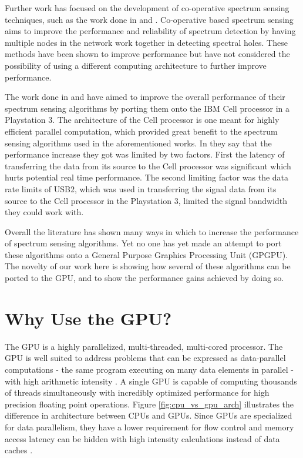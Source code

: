 Further work has focused on the development of co-operative spectrum sensing techniques, such as the work done in \cite{GanLi05} and \cite{SadAzm08}.  Co-operative based spectrum sensing aims to improve the performance and reliability of spectrum detection by having multiple nodes in the network work together in detecting spectral holes.  These methods have been shown to improve performance but have not considered the possibility of using a different computing architecture to further improve performance.

The work done in \cite{OshClaEbe07} and \cite{FenBos07} have aimed to improve the overall performance of their spectrum sensing algorithms by porting them onto the IBM Cell processor in a Playstation 3.  The architecture of the Cell processor is one meant for highly efficient parallel computation, which provided great benefit to the spectrum sensing algorithms used in the aforementioned works.  In \cite{FenBos07} they say that the performance increase they got was limited by two factors.  First the latency of transferring the data from its source to the Cell processor was significant which hurts potential real time performance.  The second limiting factor was the data rate limits of USB2, which was used in transferring the signal data from its source to the Cell processor in the Playstation 3, limited the signal bandwidth they could work with.

Overall the literature has shown many ways in which to increase the performance of spectrum sensing algorithms.  Yet no one has yet made an attempt to port these algorithms onto a General Purpose Graphics Processing Unit (GPGPU).  The novelty of our work here is showing how several of these algorithms can be ported to the GPU, and to show the performance gains achieved by doing so.

\section{Why Use the GPU?}
\label{sect:gpu_why_use_gpu}
The GPU is a highly parallelized, multi-threaded, multi-cored processor.  The GPU is well suited to address problems that can be expressed as data-parallel computations - the same program executing on many data elements in parallel - with high arithmetic intensity \cite{Nvidia08}.  A single GPU is capable of computing thousands of threads simultaneously with incredibly optimized performance for high precision floating point operations.  Figure \ref{fig:cpu_vs_gpu_arch} illustrates the difference in architecture between CPUs and GPUs.  Since GPUs are specialized for data parallelism, they have a lower requirement for flow control and memory access latency can be hidden with high intensity calculations instead of data caches \cite{Nvidia08}.  

